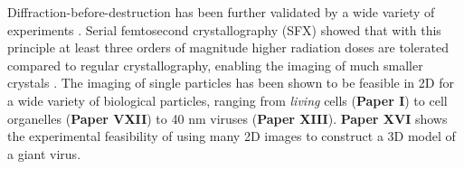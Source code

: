 Diffraction-before-destruction has been further validated by a wide variety of experiments \cite{Seibert2010,Seibert2011}. Serial femtosecond crystallography (SFX) showed that with this principle at least three orders of magnitude higher radiation doses are tolerated compared to regular crystallography, enabling the imaging of much smaller crystals \cite{Chapman2011}. The imaging of single particles has been shown to be feasible in 2D for a wide variety of biological particles, ranging from \textit{living} cells (\textbf{Paper I}) to cell organelles (\textbf{Paper VXII}) to  40 nm viruses (\textbf{Paper XIII}). \textbf{Paper XVI} shows the experimental feasibility of using many 2D images to construct a 3D model of a giant virus.

 